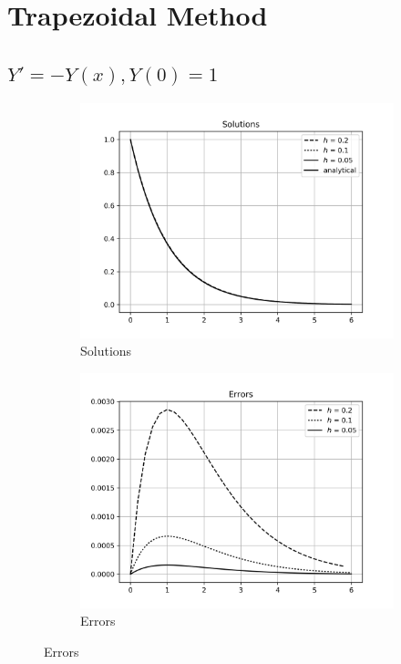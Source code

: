 \documentclass[12,a4paper]{article}
\begin{document}
    \section{Trapezoidal Method}
    
    \subsection{$Y' = -Y(x), Y(0) = 1$}
    
    \begin{figure}[H]
        \centering
        \begin{subfigure}[t]{0.49\textwidth}
            \includegraphics[width = \textwidth]{plots/trapezoidal_1.png}
            \caption{Solutions}
            \label{fig:sol_t1}
        \end{subfigure}
        \begin{subfigure}[t]{0.49\textwidth}
            \includegraphics[width = \textwidth]{plots/trapezoidal_error_1.png}
            \caption{Errors}
            \label{fig:err_t1}
        \end{subfigure}
    \end{figure}
    
\end{document}
